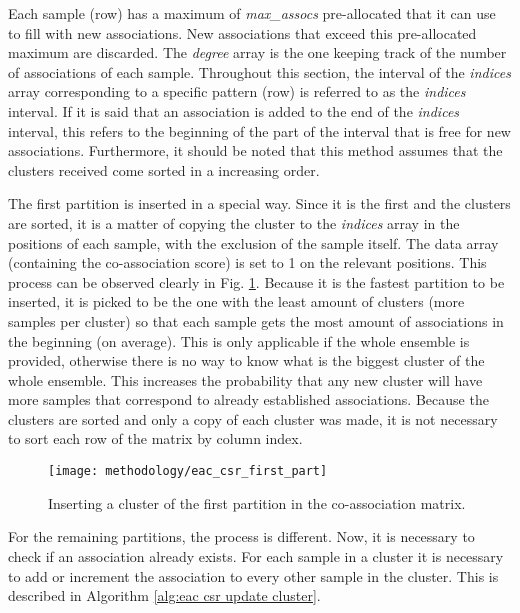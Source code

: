 Each sample (row) has a maximum of \emph{max\_assocs} pre-allocated that it can use to fill with new associations.
New associations that exceed this pre-allocated maximum are discarded.
The \emph{degree} array is the one keeping track of the number of associations of each sample.
Throughout this section, the interval of the \emph{indices} array corresponding to a specific pattern (row) is referred to as the \emph{indices} interval.
If it is said that an association is added to the end of the \emph{indices} interval, this refers to the beginning of the part of the interval that is free for new associations.
Furthermore, it should be noted that this method assumes that the clusters received come sorted in a increasing order.

The first partition is inserted in a special way.
Since it is the first and the clusters are sorted, it is a matter of copying the cluster to the \emph{indices} array in the positions of each sample, with the exclusion of the sample itself.
The data array (containing the co-association score) is set to 1 on the relevant positions.
This process can be observed clearly in Fig. \ref{fig:first part}.
Because it is the fastest partition to be inserted, it is picked to be the one with the least amount of clusters (more samples per cluster) so that each sample gets the most amount of associations in the beginning (on average).
This is only applicable if the whole ensemble is provided, otherwise there is no way to know what is the biggest cluster of the whole ensemble.
This increases the probability that any new cluster will have more samples that correspond to already established associations.
Because the clusters are sorted and only a copy of each cluster was made, it is not necessary to sort each row of the matrix by column index.

\begin{figure}[hbtp]
\centering
\texttt{[image: methodology/eac\_csr\_first\_part]}
\caption{Inserting a cluster of the first partition in the co-association matrix.}
\label{fig:first part}
\end{figure}

For the remaining partitions, the process is different.
Now, it is necessary to check if an association already exists.
For each sample in a cluster it is necessary to add or increment the association to every other sample in the cluster.
This is described in Algorithm \ref{alg:eac csr update cluster}.


